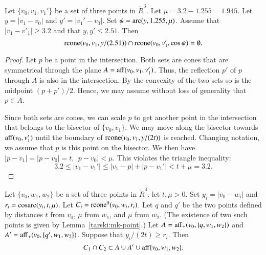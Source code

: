 \begin{tarskidata}
\begin{tarski}
\begin{lemma}
Let $\{v_0,v_1,v_1'\}$ be a set of three points in $\ring{R}^3$.
Let  
$\mu = 3.2 - 1.255 = 1.945$.  Let $y = |v_1-v_0|$ and $y'=|v_1'-v_0|$.
Set $\psi = \operatorname{arc}(y,1.255,\mu)$.
Assume that $|v_1-v'_1|\ge 3.2$ and that $y,y'\le 2.51$.
Then 
   $$
   {\operatorname{rcone}}(v_0,v_1,y/(2.51))\cap {\operatorname{rcone}}(v_0,v_1',\cos\psi)
   =\emptyset .
   $$
\end{lemma}


\begin{proof}
Let $p$ be a point in the intersection.  Both sets are cones
that are symmetrical through the plane $A={\operatorname{aff}}(v_0,v_1,v_1')$.
Thus, the reflection $p'$ of $p$ through $A$ is also
in the intersection.  By the convexity of the two sets so is
the midpoint $(p+p')/2$.  Hence, we may assume without loss of
generality that $p\in A$.

Since both sets are cones,
we can scale $p$ to get another point in the intersection  
that belongs to the bisector of $\{v_0,v_1\}$.  We may
move along the bisector towards ${\operatorname{aff}}(v_0,v_1')$ until
the boundary of ${\operatorname{rcone}}(v_0,v_1,y/(2t))$ is reached.
Changing notation,
we assume that $p$ is this point on the bisector.
We then have $|p-v_1|=|p-v_0|=t$, $|p-v_0|< \mu$.
This violates the triangle inequality:
  $$
  3.2\le |v_1-v_1'| \le |v_1-p| + |p-v_1'| < t + \mu = 3.2. 
  $$
\end{proof}
\end{tarski}





\begin{tarski}

\begin{lemma}
Let $\{v_0,w_1,w_2\}$ be a set of three points in $\ring{R}^3$.
let $t,\mu > 0$.  Set $y_i=|v_0-w_i|$
and $r_i={\operatorname{cosarc}}(y_i,t,\mu)$.
Let $C_i={\operatorname{rcone}}^0(v_0,w_i,r_i)$.
Let $q$ and $q'$ be the two points defined by distances
$t$ from $v_0$, $\mu$ from $w_1$, and $\mu$ from $w_2$.
(The existence of two such points is given by Lemma~\ref{tarski:mk-point}.)
Let $A={\operatorname{aff}}_+(v_0,\{q,w_1,w_2\})$ and
$A'={\operatorname{aff}}_+(v_0,\{q',w_1,w_2\})$.
Suppose that $y_i/(2t) \ge r_i$.
Then $$C_1\cap C_2 \subset A\cup A'\cup
      {\operatorname{aff}}\{v_0,w_1,w_2\}.$$
\end{lemma}


\end{tarski}
\end{tarskidata}
